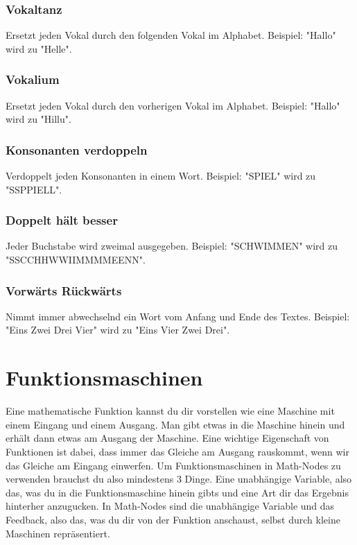 \documentclass[12pt]{report}
\begin{document}
\subsubsection{Vokaltanz}
Ersetzt jeden Vokal durch den folgenden Vokal im Alphabet. Beispiel: "Hallo" wird zu "Helle".

\subsubsection{Vokalium}
Ersetzt jeden Vokal durch den vorherigen Vokal im Alphabet. Beispiel: "Hallo" wird zu "Hillu".

\subsubsection{Konsonanten verdoppeln}
Verdoppelt jeden Konsonanten in einem Wort. Beispiel: "SPIEL" wird zu "SSPPIELL".

\subsubsection{Doppelt hält besser}
Jeder Buchstabe wird zweimal ausgegeben. Beispiel: "SCHWIMMEN" wird zu "SSCCHHWWIIMMMMEENN".

\subsubsection{Vorwärts Rückwärts}
Nimmt immer abwechselnd ein Wort vom Anfang und Ende des Textes. Beispiel: "Eins Zwei Drei Vier" wird zu "Eins Vier Zwei Drei".

\section{Funktionsmaschinen}
Eine mathematische Funktion kannst du dir vorstellen wie eine Maschine mit einem Eingang und einem Ausgang. Man gibt etwas in die Maschine hinein und erhält dann etwas am Ausgang der Maschine. Eine wichtige Eigenschaft von Funktionen ist dabei, dass immer das Gleiche am Ausgang rauskommt, wenn wir das Gleiche am Eingang einwerfen. Um Funktionsmaschinen in Math-Nodes zu verwenden brauchst du also mindestens 3 Dinge. Eine unabhängige Variable, also das, was du in die Funktionsmaschine hinein gibts und eine Art dir das Ergebnis hinterher anzugucken. In Math-Nodes sind die unabhängige Variable und das Feedback, also das, was du dir von der Funktion anschaust, selbst durch kleine Maschinen repräsentiert. 
\end{document}
